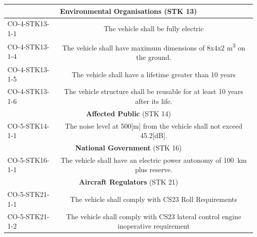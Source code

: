 \begin{table}[H]
{\begin{tabular}{l|c}
                \\ \midrule
\multicolumn{2}{c}{\textbf{Environmental Organisations} (STK 13)}                                                                                                                                         \\ \midrule
CO-4-STK13-1-1                     & The vehicle shall be fully electric                                                                                                                         \\
CO-4-STK13-1-4                     & The vehicle shall have maximum dimensions of 8x4x2 \unit{m^3} on the ground.                                                                      \\
CO-4-STK13-1-5                     & The vehicle shall have a lifetime greater than 10 years                                                                                                     \\
\multicolumn{1}{l}{CO-4-STK13-1-6} & The vehicle structure shall be reusable for at least 10 years after its life.                                                                               \\ \midrule
\multicolumn{2}{c}{\textbf{Affected Public} (STK 14)}                                                                                                                                                     \\ \midrule
CO-5-STK14-1-1                     & The noise level at 500{[}m{]} from the vehicle shall not exceed 45.2{[}dB{]}.                                                                                \\ \midrule
\multicolumn{2}{c}{\textbf{National Government} (STK 16)}                                                                                                                                                 \\ \midrule
CO-5-STK16-1-1                     & The vehicle shall have an electric power autonomy of \qty{100}{km} plus reserve.    
 \\ \midrule
\multicolumn{2}{c}{\textbf{Aircraft Regulators} (STK 21)}                                                                                                                                                 \\ \midrule
CO-5-STK21-1-1 & The vehicle shall comply with CS23 Roll Requirements \\
CO-5-STK21-1-2 & The vehicle shall comply with CS23 lateral control engine inoperative requirement\\\bottomrule
\end{tabular}}
\end{table}

